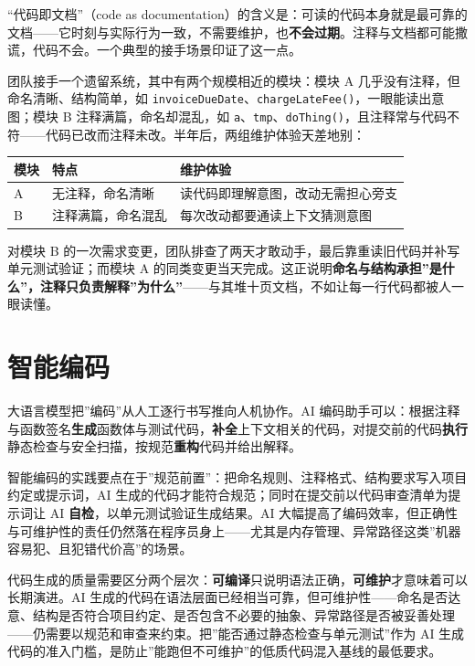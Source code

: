 \documentclass[
]{ctexbook}
\newcounter{none}
\begin{document}
``代码即文档''（code as
documentation）的含义是：可读的代码本身就是最可靠的文档------它时刻与实际行为一致，不需要维护，也\textbf{不会过期}。注释与文档都可能撒谎，代码不会。一个典型的接手场景印证了这一点。

团队接手一个遗留系统，其中有两个规模相近的模块：模块 A
几乎没有注释，但命名清晰、结构简单，如
\texttt{invoiceDueDate}、\texttt{chargeLateFee()}，一眼能读出意图；模块
B 注释满篇，命名却混乱，如
\texttt{a}、\texttt{tmp}、\texttt{doThing()}，且注释常与代码不符------代码已改而注释未改。半年后，两组维护体验天差地别：

{\def\LTcaptype{none} %
\begin{longtable}[]{@{}lll@{}}
\toprule\noalign{}
模块 & 特点 & 维护体验 \\
\midrule\noalign{}
\endhead
\bottomrule\noalign{}
\endlastfoot
A & 无注释，命名清晰 & 读代码即理解意图，改动无需担心旁支 \\
B & 注释满篇，命名混乱 & 每次改动都要通读上下文猜测意图 \\
\end{longtable}
}

对模块 B
的一次需求变更，团队排查了两天才敢动手，最后靠重读旧代码并补写单元测试验证；而模块
A
的同类变更当天完成。这正说明\textbf{命名与结构承担''是什么''，注释只负责解释''为什么''}------与其堆十页文档，不如让每一行代码都被人一眼读懂。

\section{智能编码}\label{ux667aux80fdux7f16ux7801}

大语言模型把''编码''从人工逐行书写推向人机协作。AI
编码助手可以：根据注释与函数签名\textbf{生成}函数体与测试代码，\textbf{补全}上下文相关的代码，对提交前的代码\textbf{执行}静态检查与安全扫描，按规范\textbf{重构}代码并给出解释。

智能编码的实践要点在于''规范前置''：把命名规则、注释格式、结构要求写入项目约定或提示词，AI
生成的代码才能符合规范；同时在提交前以代码审查清单为提示词让 AI
\textbf{自检}，以单元测试验证生成结果。AI
大幅提高了编码效率，但正确性与可维护性的责任仍然落在程序员身上------尤其是内存管理、异常路径这类''机器容易犯、且犯错代价高''的场景。

代码生成的质量需要区分两个层次：\textbf{可编译}只说明语法正确，\textbf{可维护}才意味着可以长期演进。AI
生成的代码在语法层面已经相当可靠，但可维护性------命名是否达意、结构是否符合项目约定、是否包含不必要的抽象、异常路径是否被妥善处理------仍需要以规范和审查来约束。把''能否通过静态检查与单元测试''作为
AI
生成代码的准入门槛，是防止''能跑但不可维护''的低质代码混入基线的最低要求。
\end{document}
